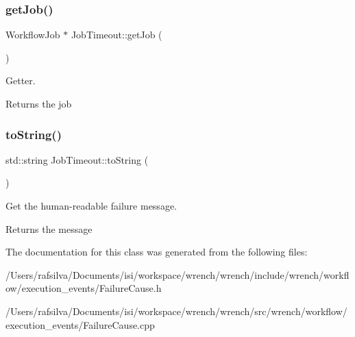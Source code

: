 \subsubsection{\texorpdfstring{get\+Job()}{getJob()}}
{\footnotesize\ttfamily Workflow\+Job $\ast$ Job\+Timeout\+::get\+Job (\begin{DoxyParamCaption}{ }\end{DoxyParamCaption})}



Getter. 

\begin{DoxyReturn}{Returns}
the job 
\end{DoxyReturn}
\mbox{\label{class_job_timeout_ad5c2b85eb741482c42da8b1509af9eca}} 
\subsubsection{\texorpdfstring{to\+String()}{toString()}}
{\footnotesize\ttfamily std\+::string Job\+Timeout\+::to\+String (\begin{DoxyParamCaption}{ }\end{DoxyParamCaption})}



Get the human-\/readable failure message. 

\begin{DoxyReturn}{Returns}
the message 
\end{DoxyReturn}


The documentation for this class was generated from the following files\+:\begin{DoxyCompactItemize}
\item 
/\+Users/rafsilva/\+Documents/isi/workspace/wrench/wrench/include/wrench/workflow/execution\+\_\+events/Failure\+Cause.\+h\item 
/\+Users/rafsilva/\+Documents/isi/workspace/wrench/wrench/src/wrench/workflow/execution\+\_\+events/Failure\+Cause.\+cpp\end{DoxyCompactItemize}
